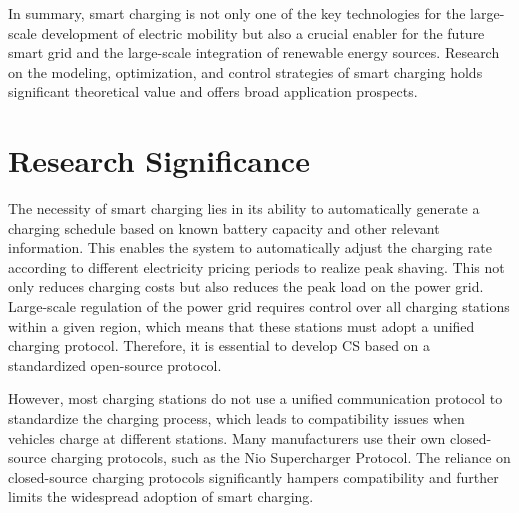 \documentclass[
	english,
	ruledheaders=section,%
	class=report,%
	thesis={type=Report},%
	accentcolor=9c,%
	custommargins=true,%
	marginpar=false,%
	parskip=half-,%
	fontsize=11pt,%
	logofile={img/tuda_logo.pdf}, %
]{tudapub}
\begin{document}
In summary, smart charging is not only one of the key technologies for the large-scale development of electric mobility but also a crucial enabler for the future smart grid and the large-scale integration of renewable energy sources. Research on the modeling, optimization, and control strategies of smart charging holds significant theoretical value and offers broad application prospects.







\section{Research Significance}

The necessity of smart charging lies in its ability to automatically generate a charging schedule based on known battery capacity and other relevant information. This enables the system to automatically adjust the charging rate according to different electricity pricing periods to realize peak shaving. This not only reduces charging costs but also reduces the peak load on the power grid.
Large-scale regulation of the power grid requires control over all charging stations within a given region, which means that these stations must adopt a unified charging protocol. Therefore, it is essential to develop \ac{CS} based on a standardized open-source protocol.

However, most charging stations do not use a unified communication protocol to standardize the charging process, which leads to compatibility issues when vehicles charge at different stations. Many manufacturers use their own closed-source charging protocols, such as the Nio Supercharger Protocol. The reliance on closed-source charging protocols significantly hampers compatibility and further limits the widespread adoption of smart charging.
\end{document}
